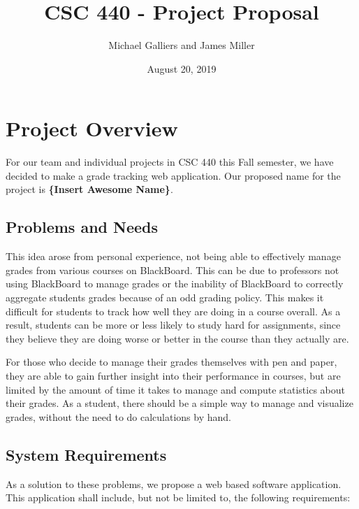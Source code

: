 \documentclass[12pt]{article}
\author{Michael Galliers and James Miller}
\title{CSC 440 - Project Proposal}
\date{August 20, 2019}
\begin{document}
\begin{titlepage}
\maketitle
\end{titlepage}

\tableofcontents


\section{Project Overview}
For our team and individual projects in CSC 440 this Fall semester, we have decided to make a grade
tracking web application. Our proposed name for the project is \textbf{\{Insert Awesome Name\}}.

\subsection{Problems and Needs}
This idea arose from personal experience, not being able to effectively manage grades from various
courses on BlackBoard. This can be due to professors not using BlackBoard to manage grades or the
inability of BlackBoard to correctly aggregate students grades because of an odd grading policy.
This makes it difficult for students to track how well they are doing in a course overall. As a
result, students can be more or less likely to study hard for assignments, since they believe they
are doing worse or better in the course than they actually are.

For those who decide to manage their grades themselves with pen and paper, they are able to gain
further insight into their performance in courses, but are limited by the amount of time it takes to
manage and compute statistics about their grades. As a student, there should be a simple way to
manage and visualize grades, without the need to do calculations by hand.

\subsection{System Requirements}
As a solution to these problems, we propose a web based software application. This application shall
include, but not be limited to, the following requirements:
\end{document}

